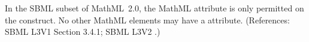 In the SBML subset of MathML~2.0, the MathML attribute
 is only permitted on the  construct.
No other MathML elements may have a  attribute.
(References: SBML L3V1 Section 3.4.1; SBML L3V2 .)
